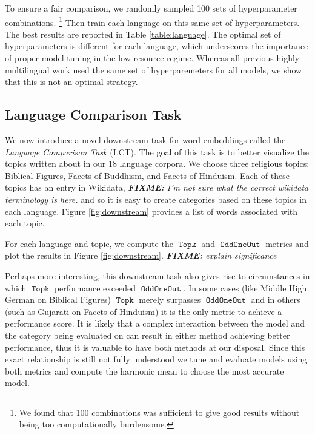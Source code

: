 \documentclass[11pt,a4paper]{article}
\DeclareMathOperator{\OddOneOut}{\texttt{OddOneOut}}
\DeclareMathOperator{\topk}{\texttt{Topk}}
\newcommand{\fixme}[1]{{\color{red}\itshape \textbf{FIXME:} {#1}}}
\begin{document}
To ensure a fair comparison,
we randomly sampled 100 sets of hyperparameter combinations.%
\footnote{We found that 100 combinations was sufficient to give good results without being too computationally burdensome.}
Then train each language on this same set of hyperparameters.
The best results are reported in Table \ref{table:language}.
The optimal set of hyperparameters is different for each language,
which underscores the importance of proper model tuning in the low-resource regime.
Whereas all previous highly multilingual work used the same set of hyperparemeters for all models,
we show that this is not an optimal strategy.

\subsection{Language Comparison Task}

We now introduce a novel downstream task for word embeddings called the \emph{Language Comparison Task} (LCT).
The goal of this task is to better visualize the topics written about in our 18 language corpora.
We choose three religious topics: Biblical Figures, Facets of Buddhism, and Facets of Hinduism.
Each of these topics has an entry in Wikidata,
\fixme{I'm not sure what the correct wikidata terminology is here.}
and so it is easy to create categories based on these topics in each language.
Figure \ref{fig:downstream} provides a list of words associated with each topic.

For each language and topic, we compute the $\topk$ and $\OddOneOut$ metrics and plot the results in Figure \ref{fig:downstream}.
\fixme{explain significance}


Perhaps more interesting, this downstream task also gives rise to circumstances in which $\topk$ performance exceeded $\OddOneOut$. 
In some cases (like Middle High German on Biblical Figures) $\topk$ merely surpasses $\OddOneOut$ 
and in others (such as Gujarati on Facets of Hinduism) it is the only metric to achieve a performance score. 
It is likely that a complex interaction between the model and the category being evaluated on can result in either method achieving better performance, 
thus it is valuable to have both methods at our disposal. 
Since this exact relationship is still not fully understood we tune and evaluate models using both metrics 
and compute the harmonic mean to choose the most accurate model.
\end{document}
